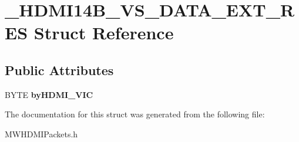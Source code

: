 \hypertarget{struct__HDMI14B__VS__DATA__EXT__RES}{\section{\-\_\-\-H\-D\-M\-I14\-B\-\_\-\-V\-S\-\_\-\-D\-A\-T\-A\-\_\-\-E\-X\-T\-\_\-\-R\-E\-S Struct Reference}
\label{struct__HDMI14B__VS__DATA__EXT__RES}
}
\subsection*{Public Attributes}
\begin{DoxyCompactItemize}
\item 
\hypertarget{struct__HDMI14B__VS__DATA__EXT__RES_a18065e20b3b778a399d72268c47f8266}{B\-Y\-T\-E {\bfseries by\-H\-D\-M\-I\-\_\-\-V\-I\-C}}\label{struct__HDMI14B__VS__DATA__EXT__RES_a18065e20b3b778a399d72268c47f8266}

\end{DoxyCompactItemize}


The documentation for this struct was generated from the following file\-:\begin{DoxyCompactItemize}
\item 
M\-W\-H\-D\-M\-I\-Packets.\-h\end{DoxyCompactItemize}

